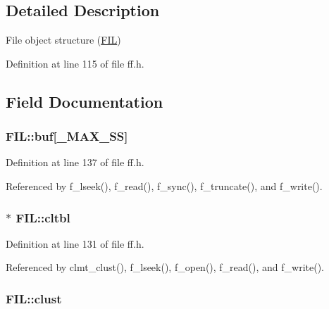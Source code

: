 \subsection{Detailed Description}
File object structure (\hyperlink{structFIL}{F\-I\-L}) 

Definition at line 115 of file ff.\-h.



\subsection{Field Documentation}
\hypertarget{structFIL_a7a95fb86588663e48309b5cded7e207b}{
\subsubsection[{buf}]{ F\-I\-L\-::buf\mbox{[}{\bf \-\_\-\-M\-A\-X\-\_\-\-S\-S}\mbox{]}}}\label{structFIL_a7a95fb86588663e48309b5cded7e207b}


Definition at line 137 of file ff.\-h.



Referenced by f\-\_\-lseek(), f\-\_\-read(), f\-\_\-sync(), f\-\_\-truncate(), and f\-\_\-write().

\hypertarget{structFIL_a28a30613d48cefcf9efbd334cd861fc8}{
\subsubsection[{cltbl}]{$\ast$ F\-I\-L\-::cltbl}}\label{structFIL_a28a30613d48cefcf9efbd334cd861fc8}


Definition at line 131 of file ff.\-h.



Referenced by clmt\-\_\-clust(), f\-\_\-lseek(), f\-\_\-open(), f\-\_\-read(), and f\-\_\-write().

\hypertarget{structFIL_aa41312aba551b9a6d1c9d3c8c7d2734b}{
\subsubsection[{clust}]{ F\-I\-L\-::clust}}\label{structFIL_aa41312aba551b9a6d1c9d3c8c7d2734b}


